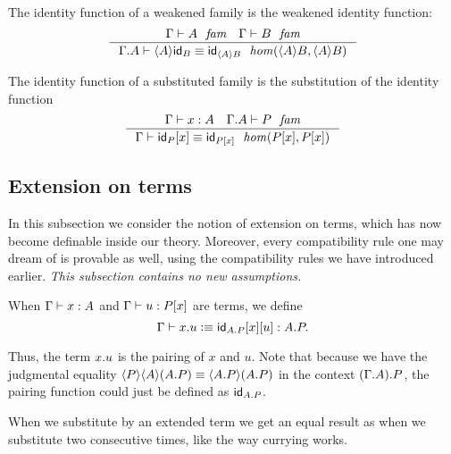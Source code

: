 The identity function of a weakened family is the weakened identity function:
\begin{equation}\label{idfunc-wk-comp}
\inference
  {\jfam{\Gamma}{A}
   \jfam{\Gamma}{B}}
  {\jhomeq{{\Gamma}{A}}{\ctxwk{A}{B}}{\ctxwk{A}{B}}{\ctxwk{A}{\idfunc[B]}}{\idfunc[\ctxwk{A}{B}]}}
\end{equation}

The identity function of a substituted family is the substitution of the identity function
\begin{equation}\label{idfunc-subst-comp}
\inference
  {\jterm{\Gamma}{A}{x}
   \jfam{{\Gamma}{A}}{P}}
  {\jhomeq{\Gamma}{\subst{x}{P}}{\subst{x}{P}}{\subst{x}{\idfunc[P]}}{\idfunc[\subst{x}{P}]}}
\end{equation}

\subsection{Extension on terms}\label{extension-on-terms}
In this subsection we consider the notion of extension on terms, which has now
become definable inside our theory. Moreover, every compatibility rule one may
dream of is provable as well, using the compatibility rules we have introduced
earlier. \emph{This subsection contains no new assumptions.}

\begin{defn}
When $\jterm{\Gamma}{A}{x}$ and $\jterm{\Gamma}{\subst{x}{P}}{u}$ are terms,
we define 
\begin{equation*}
\jtermdefn{\Gamma}{\ctxext{A}{P}}{\tmext{A}{P}{x}{u}}{\unfold{\tmext{A}{P}{x}{u}}}.
\end{equation*} 
\end{defn}

Thus, the term $\tmext{A}{P}{x}{u}$ is the pairing of $x$ and $u$. Note that because
we have the judgmental equality 
$\ctxwk{P}{{A}{\ctxext{A}{P}}}\jdeq\ctxwk{\ctxext{A}{P}}{\ctxext{A}{P}}$ in the
context $\ctxext{{\Gamma}{A}}{P}$, the
pairing function could just be defined as $\idfunc[\ctxext{A}{P}]$. 

When we substitute by an extended term we get an equal result as when we
substitute two consecutive times, like the way currying works.

